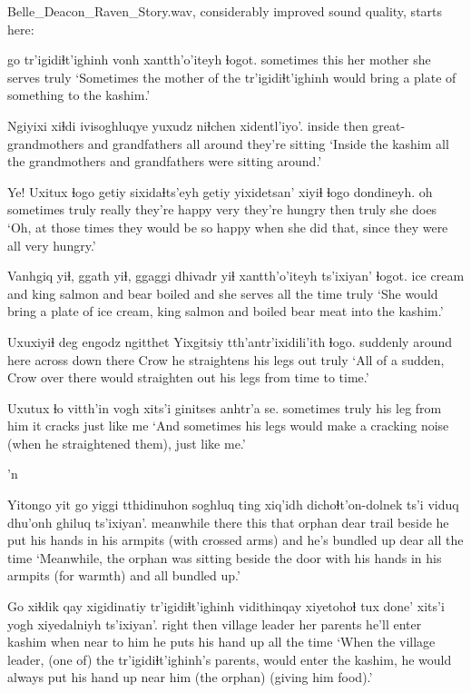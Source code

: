 \documentclass[12pt]{article}
\begin{document}
Belle\_Deacon\_Raven\_Story.wav, considerably improved sound quality, starts here:

 go   tr'igidiɬt'ighinh vonh       xantth'o'iteyh ɬogot.
sometimes              this {}              {her mother} {she serves }    truly
\glt `Sometimes the mother of the tr'igidiɬt'ighinh would bring a plate of something to the kashim.'
\glend

\gll Ngiyixi xiɬdi ivisoghluqye                        yuxudz niɬchen {xidentl'iyo'.}
inside  then  {great-grandmothers and grandfathers} all    around  {they're sitting}
\glt `Inside the kashim all the grandmothers and grandfathers were sitting around.'
\glend

\gll Ye! Uxitux    ɬogo  getiy  sixidaɬts'eyh getiy yixidetsan'    xiyiɬ ɬogo  dondineyh.
oh  sometimes truly really {they're happy} very  {they're hungry} then  truly {she does}
\glt `Oh, at those times they would be so happy when she did that, since they were all very hungry.'
\glend

\gll Vanhgiq   yiɬ, ggath       yiɬ, ggaggi    dhivadr yiɬ xantth'o'iteyh ts'ixiyan' ɬogot.
{ice cream} and  {king salmon} and  bear  boiled  and {she serves}  {all the time} truly
\glt `She would bring a plate of ice cream, king salmon and boiled bear meat into the kashim.'
\glend

\gll Uxuxiyiɬ deg         engodz ngitthet   Yixgitsiy tth'antr'ixidili'ith           ɬogo.
suddenly {around here} across {down there} Crow   {he straightens his legs out} truly
\glt `All of a sudden, Crow over there would straighten out his legs from time to time.'
\glend

\gll Uxutux    ɬo    vitth'in {vogh xits'i} ginitses         anhtr'a   se.
sometimes truly {his leg}  {from him}  {it cracks} {just like} me
\glt `And sometimes his legs would make a cracking noise (when he straightened them), just like me.'
\glend

'n

\gll Yitongo   yit   go   yiggi tthidinuhon soghluq ting  xiq'idh dichoɬt'on-dolnek          ts'i {viduq dhu'onh}   ghiluq ts'ixiyan'.
meanwhile there this that  orphan      dear    trail beside {he put his hands in his armpits (with crossed arms)} and {he's bundled up} dear {all the time}
\glt `Meanwhile, the orphan was sitting beside the door with his hands in his armpits (for warmth) and all bundled up.'
\glend

\gll Go xiɬdik  qay     xigidinatiy tr'igidiɬt'ighinh vidithinqay xiyetohoɬ              tux  {done' xits'i} yogh   xiyedalniyh         ts'ixiyan'.
right then village leader      {}              {her parents} {he'll enter kashim} when near      {to him} {he puts his hand up} {all the time}
\glt `When the village leader, (one of) the tr'igidiɬt'ighinh's parents, would enter the kashim, he would always put his hand up near him (the orphan) (giving him food).' 
\glend
\end{document}
